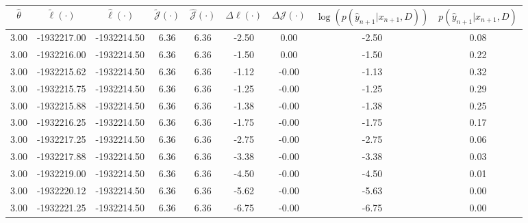 \begin{table}[htbp]
        \centering
        \tiny
        \begin{adjustbox}{angle=90}
            \begin{tabular}{|c|c|c|c|c|c|c|c|c|}
                \hline
                 $\hat{\theta}$ & $\tilde{\ell}(\cdot)$ & $\hat{\ell}(\cdot)$ & $\tilde{\mathcal{J}}(\cdot)$ & $\hat{\mathcal{J}}(\cdot)$ & $\Delta \ell(\cdot)$ & $\Delta \mathcal{J}(\cdot)$ & $\log(p(\hat{y}_{n+1}|x_{n+1}, D))$ & $p(\hat{y}_{n+1}|x_{n+1}, D)$ \\
                \hline
                 3.00 & -1932217.00 & -1932214.50 & 6.36 & 6.36 & -2.50 & 0.00 & -2.50 & 0.08\\ \hline
 3.00 & -1932216.00 & -1932214.50 & 6.36 & 6.36 & -1.50 & 0.00 & -1.50 & 0.22\\ \hline
 3.00 & -1932215.62 & -1932214.50 & 6.36 & 6.36 & -1.12 & -0.00 & -1.13 & 0.32\\ \hline
 3.00 & -1932215.75 & -1932214.50 & 6.36 & 6.36 & -1.25 & -0.00 & -1.25 & 0.29\\ \hline
 3.00 & -1932215.88 & -1932214.50 & 6.36 & 6.36 & -1.38 & -0.00 & -1.38 & 0.25\\ \hline
 3.00 & -1932216.25 & -1932214.50 & 6.36 & 6.36 & -1.75 & -0.00 & -1.75 & 0.17\\ \hline
 3.00 & -1932217.25 & -1932214.50 & 6.36 & 6.36 & -2.75 & -0.00 & -2.75 & 0.06\\ \hline
 3.00 & -1932217.88 & -1932214.50 & 6.36 & 6.36 & -3.38 & -0.00 & -3.38 & 0.03\\ \hline
 3.00 & -1932219.00 & -1932214.50 & 6.36 & 6.36 & -4.50 & -0.00 & -4.50 & 0.01\\ \hline
 3.00 & -1932220.12 & -1932214.50 & 6.36 & 6.36 & -5.62 & -0.00 & -5.63 & 0.00\\ \hline
 3.00 & -1932221.25 & -1932214.50 & 6.36 & 6.36 & -6.75 & -0.00 & -6.75 & 0.00\\ \hline
            \end{tabular}
        \end{adjustbox}
        \caption{}
        \label{}
    \end{table}
    